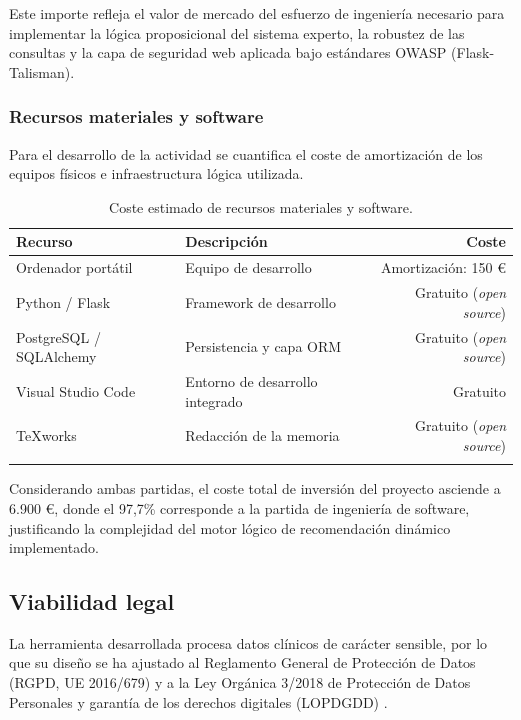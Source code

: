 Este importe refleja el valor de mercado del esfuerzo de ingeniería necesario para implementar la lógica proposicional del sistema experto, la robustez de las consultas y la capa de seguridad web aplicada bajo estándares OWASP (Flask-Talisman).

\subsubsection{Recursos materiales y software}
Para el desarrollo de la actividad se cuantifica el coste de amortización de los equipos físicos e infraestructura lógica utilizada.

\begin{table}[!h]
    \centering
    \begin{tabularx}{\textwidth}{ l X r }
        \toprule
        \textbf{Recurso} & \textbf{Descripción} & \textbf{Coste} \\
        \midrule
        \addlinespace
        Ordenador portátil & Equipo de desarrollo & Amortización: 150 € \\
        \addlinespace
        Python / Flask & Framework de desarrollo & Gratuito (\textit{open source}) \\
        \addlinespace
        PostgreSQL / SQLAlchemy & Persistencia y capa ORM & Gratuito (\textit{open source}) \\
        \addlinespace
        Visual Studio Code & Entorno de desarrollo integrado & Gratuito \\
        \addlinespace
        TeXworks & Redacción de la memoria & Gratuito (\textit{open source}) \\
        \addlinespace
        \bottomrule
    \end{tabularx}
    \caption{Coste estimado de recursos materiales y software.}
\end{table}
\FloatBarrier

Considerando ambas partidas, el coste total de inversión del proyecto asciende a 6.900 €, donde el 97,7\% corresponde a la partida de ingeniería de software, justificando la complejidad del motor lógico de recomendación dinámico implementado.

\subsection{Viabilidad legal}
La herramienta desarrollada procesa datos clínicos de carácter sensible, por lo que su diseño se ha ajustado al Reglamento General de Protección de Datos (RGPD, UE 2016/679) \cite{ue:rgpd} y a la Ley Orgánica 3/2018 de Protección de Datos Personales y garantía de los derechos digitales (LOPDGDD) \cite{boe:lopdgdd}.

